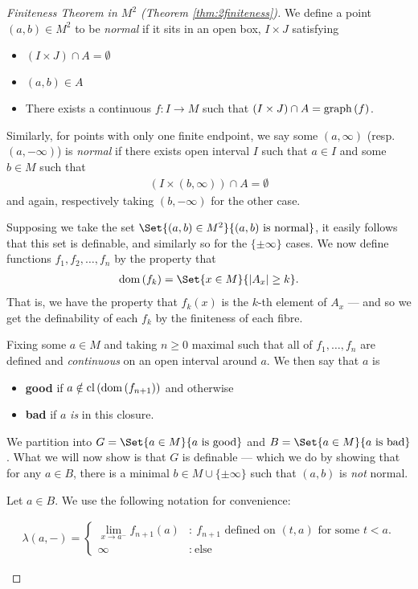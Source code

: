 \begin{proof}[Finiteness Theorem in $M^2$ (Theorem \ref{thm:2finiteness})]
	We define a point $(a, b) \in M^2$ to be \emph{normal} if it sits in an open box, $I \times J$ satisfying
	\begin{itemize}
		\item $(I \times J) \cap A = \emptyset$
		\item $(a, b) \in A$
		\item There exists a continuous $f \colon I \to M$ such that $(I \times J) \cap A = \operatorname{graph}\left(f\right)$.
	\end{itemize}

	Similarly, for points with only one finite endpoint, we say some $(a, \infty)$ (resp. $(a, - \infty)$) is \emph{normal} if there exists open interval $I$ such that $a \in I$ and some $b \in M$ such that
	\begin{align*}
		(I \times (b, \infty)) \cap A = \emptyset
	\end{align*}
	and again, respectively taking $(b, - \infty)$ for the other case.

	Supposing we take the set $\Set{(a, b) \in M^2}{(a, b) \ \textrm{is normal}}$, it easily follows that this set is definable, and similarly so for the $\{\pm \infty\}$ cases. We now define functions $f_1, f_2, \hdots, f_n$ by the property that
	\begin{align*}
		\dom{f_k} = \Set{x \in M}{\card{A_x} \geq k}.
	\end{align*}
	That is, we have the property that $f_k(x)$ is the $k$-th element of $A_x$ — and so we get the definability of each $f_k$ by the finiteness of each fibre.

	Fixing some $a \in M$ and taking $n \geq 0$ maximal such that all of $f_1, \hdots, f_n$ are defined and \emph{continuous} on an open interval around $a$. We then say that $a$ is
	\begin{itemize}
		\item \textbf{good} if  $a \notin \operatorname{cl}\left(\operatorname{dom}\left(f_{n + 1}\right)\right)$ and otherwise
		\item \textbf{bad} if $a$ \emph{is} in this closure.
	\end{itemize}
	We partition into $G = \Set{a \in M}{a \ \textrm{is good}}$ and $B = \Set{a \in M}{a \ \textrm{is bad}}$. What we will now show is that $G$ is definable — which we do by showing that for any $a \in B$, there is a minimal $b \in M \cup \{\pm \infty \}$ such that $(a, b)$ is \emph{not} normal.

	Let $a \in B$. We use the following notation for convenience:
	\begin{description}
		\item
			\begin{align*}
						\lambda(a, -) = \begin{cases}
									      \displaystyle\lim_{x \to a^{-}} f_{n + 1}(a) & \colon \ \textrm{$f_{n+1}$ defined on $(t, a)$ for some $t < a$.} \\
									      \infty & \colon \ \textrm{else}
									   \end{cases}
			\end{align*}


\end{description}
\end{proof}
